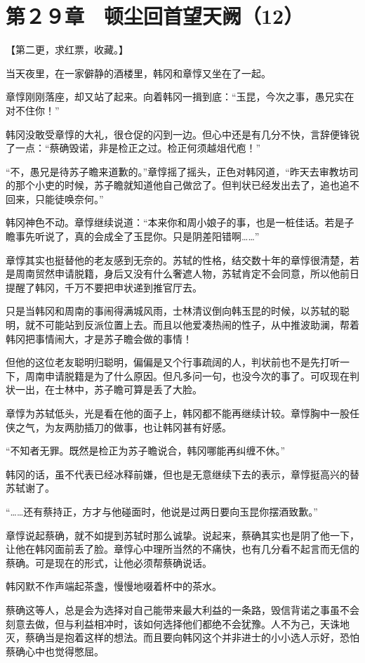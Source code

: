 \section{第２９章　顿尘回首望天阙（12）}

【第二更，求红票，收藏。】

当天夜里，在一家僻静的酒楼里，韩冈和章惇又坐在了一起。

章惇刚刚落座，却又站了起来。向着韩冈一揖到底：“玉昆，今次之事，愚兄实在对不住你！”

韩冈没敢受章惇的大礼，很仓促的闪到一边。但心中还是有几分不快，言辞便锋锐了一点：“蔡确毁诺，非是检正之过。检正何须越俎代庖！”

“不，愚兄是待苏子瞻来道歉的。”章惇摇了摇头，正色对韩冈道，“昨天去审教坊司的那个小吏的时候，苏子瞻就知道他自己做岔了。但判状已经发出去了，追也追不回来，只能徒唤奈何。”

韩冈神色不动。章惇继续说道：“本来你和周小娘子的事，也是一桩佳话。若是子瞻事先听说了，真的会成全了玉昆你。只是阴差阳错啊……”

章惇其实也挺替他的老友感到无奈的。苏轼的性格，结交数十年的章惇很清楚，若是周南贸然申请脱籍，身后又没有什么奢遮人物，苏轼肯定不会同意，所以他前日提醒了韩冈，千万不要把申状递到推官厅去。

只是当韩冈和周南的事闹得满城风雨，士林清议倒向韩玉昆的时候，以苏轼的聪明，就不可能站到反派位置上去。而且以他爱凑热闹的性子，从中推波助澜，帮着韩冈把事情闹大，才是苏子瞻会做的事情！

但他的这位老友聪明归聪明，偏偏是又个行事疏阔的人，判状前也不是先打听一下，周南申请脱籍是为了什么原因。但凡多问一句，也没今次的事了。可叹现在判状一出，在士林中，苏子瞻可算是丢了大脸。

章惇为苏轼低头，光是看在他的面子上，韩冈都不能再继续计较。章惇胸中一股任侠之气，为友两肋插刀的做事，也让韩冈甚有好感。

“不知者无罪。既然是检正为苏子瞻说合，韩冈哪能再纠缠不休。”

韩冈的话，虽不代表已经冰释前嫌，但也是无意继续下去的表示，章惇挺高兴的替苏轼谢了。

“……还有蔡持正，方才与他碰面时，他说是过两日要向玉昆你摆酒致歉。”

章惇说起蔡确，就不如提到苏轼时那么诚挚。说起来，蔡确其实也是阴了他一下，让他在韩冈面前丢了脸。章惇心中理所当然的不痛快，也有几分看不起言而无信的蔡确。可是现在的形式，让他必须帮蔡确说话。

韩冈默不作声端起茶盏，慢慢地啜着杯中的茶水。

蔡确这等人，总是会为选择对自己能带来最大利益的一条路，毁信背诺之事虽不会刻意去做，但与利益相冲时，该如何选择他们都绝不会犹豫。人不为己，天诛地灭，蔡确当是抱着这样的想法。而且要向韩冈这个并非进士的小小选人示好，恐怕蔡确心中也觉得憋屈。

